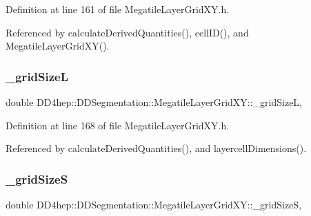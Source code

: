 Definition at line 161 of file Megatile\+Layer\+Grid\+X\+Y.\+h.



Referenced by calculate\+Derived\+Quantities(), cell\+I\+D(), and Megatile\+Layer\+Grid\+X\+Y().

\hypertarget{class_d_d4hep_1_1_d_d_segmentation_1_1_megatile_layer_grid_x_y_a463d0f581c8d384c7ed95cb4e350afd9}{}\label{class_d_d4hep_1_1_d_d_segmentation_1_1_megatile_layer_grid_x_y_a463d0f581c8d384c7ed95cb4e350afd9} 
\subsubsection{\texorpdfstring{\+\_\+grid\+SizeL}{\_gridSizeL}}
{\footnotesize\ttfamily double D\+D4hep\+::\+D\+D\+Segmentation\+::\+Megatile\+Layer\+Grid\+X\+Y\+::\+\_\+grid\+SizeL\hspace{0.3cm}{\ttfamily [mutable]}, {\ttfamily [protected]}}



Definition at line 168 of file Megatile\+Layer\+Grid\+X\+Y.\+h.



Referenced by calculate\+Derived\+Quantities(), and layercell\+Dimensions().

\hypertarget{class_d_d4hep_1_1_d_d_segmentation_1_1_megatile_layer_grid_x_y_a3a86080381739af95c9cb175fc25a5f5}{}\label{class_d_d4hep_1_1_d_d_segmentation_1_1_megatile_layer_grid_x_y_a3a86080381739af95c9cb175fc25a5f5} 
\subsubsection{\texorpdfstring{\+\_\+grid\+SizeS}{\_gridSizeS}}
{\footnotesize\ttfamily double D\+D4hep\+::\+D\+D\+Segmentation\+::\+Megatile\+Layer\+Grid\+X\+Y\+::\+\_\+grid\+SizeS\hspace{0.3cm}{\ttfamily [mutable]}, {\ttfamily [protected]}}



